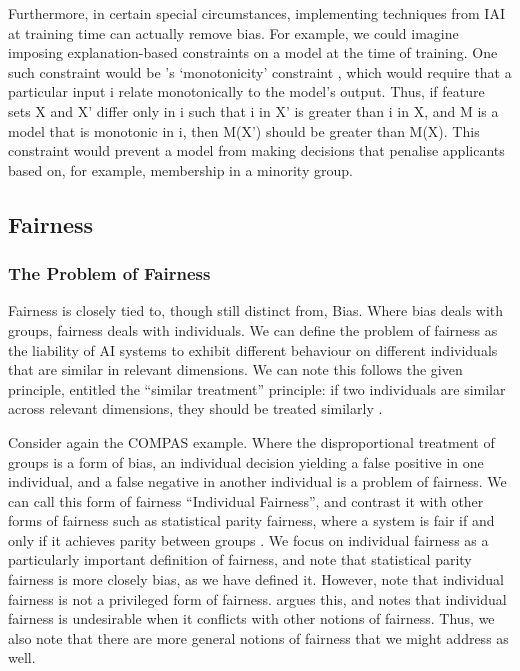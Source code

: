 Furthermore, in certain special circumstances, implementing techniques from IAI at training time can actually remove bias. For example, we could imagine imposing explanation-based constraints on a model at the time of training. One such constraint would be \textcite{wang_deontological_2020}'s `monotonicity' constraint , which would require that a particular input i relate monotonically to the model's output. Thus, if feature sets X and X' differ only in i such that i in X' is greater than i in X, and M is a model that is monotonic in i, then M(X') should be greater than M(X). This constraint would prevent a model from making decisions that penalise applicants based on, for example, membership in a minority group.

\subsection{Fairness}
\subsubsection{The Problem of Fairness}
Fairness is closely tied to, though still distinct from, Bias. Where bias deals with groups, fairness deals with individuals. We can define the problem of fairness as the liability of AI systems to exhibit different behaviour on different individuals that are similar in relevant dimensions. We can note this follows the given principle, entitled the “similar treatment” principle: if two individuals are similar across relevant dimensions, they should be treated similarly \cite{Fleisher_2021,dwork_fairness_2012}. 

Consider again the COMPAS example. Where the disproportional treatment of groups is a form of bias, an individual decision yielding a false positive in one individual, and a false negative in another individual is a problem of fairness. We can call this form of fairness “Individual Fairness”, and contrast it with other forms of fairness such as statistical parity fairness, where a system is fair if and only if it achieves parity between groups \cite{Fleisher_2021,dwork_fairness_2012}. We focus on individual fairness as a particularly important definition of fairness, and note that statistical parity fairness is more closely bias, as we have defined it. However, note that individual fairness is not a privileged form of fairness. \textcite{Fleisher_2021} argues this, and notes that individual fairness is undesirable when it conflicts with other notions of fairness. Thus, we also note that there are more general notions of fairness that we might address as well.

